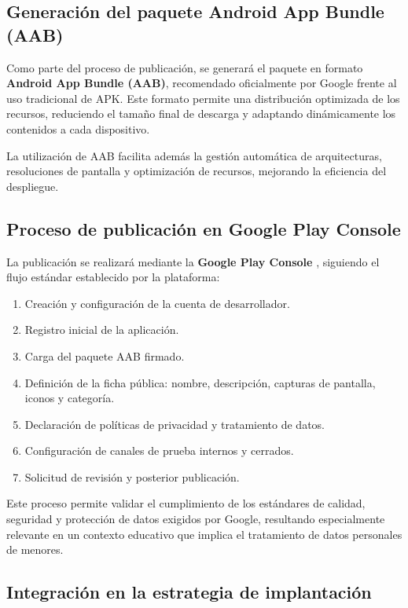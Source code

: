 \subsection{Generación del paquete Android App Bundle (AAB)}

Como parte del proceso de publicación, se generará el paquete en formato \textbf{Android App Bundle (AAB)}, recomendado oficialmente por Google frente al uso tradicional de APK. Este formato permite una distribución optimizada de los recursos, reduciendo el tamaño final de descarga y adaptando dinámicamente los contenidos a cada dispositivo.

La utilización de AAB facilita además la gestión automática de arquitecturas, resoluciones de pantalla y optimización de recursos, mejorando la eficiencia del despliegue.

\subsection{Proceso de publicación en Google Play Console}

La publicación se realizará mediante la \textbf{Google Play Console} \cite{google_play_console_docs}\cite{GooglePlayConsole}, siguiendo el flujo estándar establecido por la plataforma:

\begin{enumerate}
    \item Creación y configuración de la cuenta de desarrollador.
    \item Registro inicial de la aplicación.
    \item Carga del paquete AAB firmado.
    \item Definición de la ficha pública: nombre, descripción, capturas de pantalla, iconos y categoría.
    \item Declaración de políticas de privacidad y tratamiento de datos.
    \item Configuración de canales de prueba internos y cerrados.
    \item Solicitud de revisión y posterior publicación.
\end{enumerate}

Este proceso permite validar el cumplimiento de los estándares de calidad, seguridad y protección de datos exigidos por Google, resultando especialmente relevante en un contexto educativo que implica el tratamiento de datos personales de menores.

\subsection{Integración en la estrategia de implantación}

